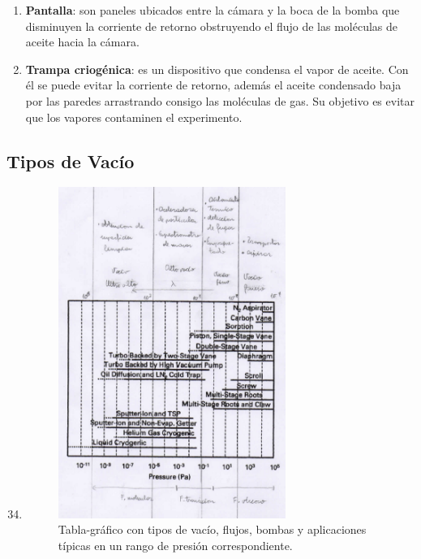 \begin{enumerate}
\begin{enumerate}
        \item %
        \textbf{Pantalla}: son paneles ubicados entre la cámara y la boca de la bomba que disminuyen la corriente de retorno obstruyendo el flujo de las moléculas de aceite hacia la cámara.

        \item %
        \textbf{Trampa criogénica}: es un dispositivo que condensa el vapor de aceite. Con él se puede evitar la corriente de retorno, además el aceite condensado baja por las paredes arrastrando consigo las moléculas de gas. Su objetivo es evitar que los vapores contaminen el experimento.
    \end{enumerate}
\end{enumerate}

\subsection{Tipos de Vacío}
\begin{enumerate}
\setcounter{enumi}{33}
    \item %
    \begin{figure}
        \centering
        \includegraphics[width=0.7\textwidth]{Imagenes/Unidad/U2/p34.png}
        \caption{Tabla-gráfico con tipos de vacío, flujos, bombas y aplicaciones típicas en un rango de presión correspondiente.}
        \label{fig:my_label}
    \end{figure}
  
\end{enumerate}


